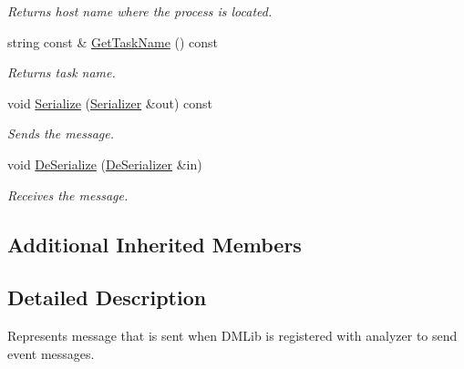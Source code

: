 \begin{DoxyCompactItemize}
\begin{DoxyCompactList}\small\item\em Returns host name where the process is located. \end{DoxyCompactList}\item 
\hypertarget{class_common_1_1_register_msg_afc8d9e7d64970c83c45f0850f3b6f652}{string const \& \hyperlink{class_common_1_1_register_msg_afc8d9e7d64970c83c45f0850f3b6f652}{Get\-Task\-Name} () const }\label{class_common_1_1_register_msg_afc8d9e7d64970c83c45f0850f3b6f652}

\begin{DoxyCompactList}\small\item\em Returns task name. \end{DoxyCompactList}\item 
\hypertarget{class_common_1_1_register_msg_a4bfb4d83fbb9020e9599ab394a57f7b1}{void \hyperlink{class_common_1_1_register_msg_a4bfb4d83fbb9020e9599ab394a57f7b1}{Serialize} (\hyperlink{class_common_1_1_serializer}{Serializer} \&out) const }\label{class_common_1_1_register_msg_a4bfb4d83fbb9020e9599ab394a57f7b1}

\begin{DoxyCompactList}\small\item\em Sends the message. \end{DoxyCompactList}\item 
\hypertarget{class_common_1_1_register_msg_a0a6042f2b893a915c5f2eaf5e6933a6e}{void \hyperlink{class_common_1_1_register_msg_a0a6042f2b893a915c5f2eaf5e6933a6e}{De\-Serialize} (\hyperlink{class_common_1_1_de_serializer}{De\-Serializer} \&in)}\label{class_common_1_1_register_msg_a0a6042f2b893a915c5f2eaf5e6933a6e}

\begin{DoxyCompactList}\small\item\em Receives the message. \end{DoxyCompactList}\end{DoxyCompactItemize}
\subsection*{Additional Inherited Members}


\subsection{Detailed Description}
Represents message that is sent when D\-M\-Lib is registered with analyzer to send event messages. 

